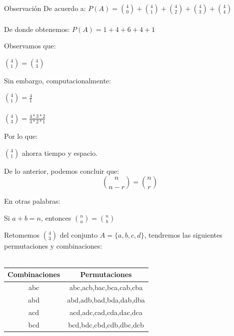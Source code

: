 \documentclass{beamer}
\begin{document}
\begin{frame}
  \begin{exampleblock}{Observación}
    De acuerdo a: 
    \centering
    $ P(A) = \binom{4}{0} + \binom{4}{1} + \binom{4}{2} + \binom{4}{3} +
    \binom{4}{4} $ \\
    \ \\
    De donde obtenemos:
    $ P(A) = 1 + 4 + 6 + 4 + 1 $
  \end{exampleblock}
  Observamos que:
  
  \begin{exampleblock}{}
    \centering
    $\binom{4}{1} = \binom{4}{3}$
  \end{exampleblock}
  
  Sin embargo, computacionalmente:

  \begin{exampleblock}{}
    \centering

    $\binom{4}{1} = \frac{4}{1}$\\
    \ \\

    $\binom{4}{3} = \frac{4*3*2}{3*2*1}$
  \end{exampleblock}
  Por lo que:
  \begin{exampleblock}{}
    \centering
    $\binom{4}{1}$ ahorra tiempo y espacio.
  \end{exampleblock}
\end{frame}

\begin{frame}
  \begin{block}{De lo anterior, podemos concluir que:}
    \begin{equation}
      \binom{n}{n-r} = \binom{n}{r}
    \end{equation}
  \end{block}
  En otras palabras:
  \begin{block}{}
    Si $a+b=n$, entonces $\binom{n}{a} = \binom{n}{b}$
  \end{block}
\end{frame}

\begin{frame}
    Retomemos $\binom{4}{3}$ del conjunto $A=\{a,b,c,d\}$, tendremos las
    siguientes permutaciones y combinaciones: \\
\ \\

\begin{center}
\begin{tabular}{cc}
   \textbf{Combinaciones } & \textbf{Permutaciones }\\
  \hline
   abc & abc,acb,bac,bca,cab,cba \\
  \hline
   abd & abd,adb,bad,bda,dab,dba \\
  \hline
   acd & acd,adc,cad,cda,dac,dca \\
  \hline
   bcd & bcd,bdc,cbd,cdb,dbc,dcb

\end{tabular}
\end{center}

\end{frame}
\end{document}
